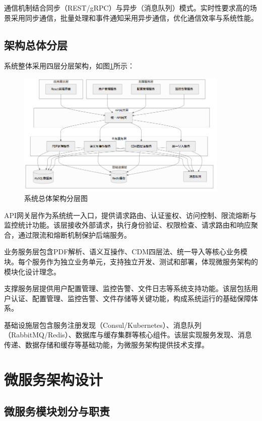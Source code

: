 通信机制结合同步（REST/gRPC）与异步（消息队列）模式。实时性要求高的场景采用同步通信，批量处理和事件通知采用异步通信，优化通信效率与系统性能。

\subsection{架构总体分层}

系统整体采用四层分层架构，如图\ref{fig:system_architecture}所示：

\begin{figure}[H]
    \centering
    \includegraphics[width=0.9\textwidth]{chapters/fig-0/system_architecture_simple.png}
    \caption{系统总体架构分层图}
    \label{fig:system_architecture}
\end{figure}

API网关层作为系统统一入口，提供请求路由、认证鉴权、访问控制、限流熔断与监控统计功能。该层接收外部请求，执行身份验证、权限检查、请求路由和响应聚合，通过限流和熔断机制保护后端服务。

业务服务层包含PDF解析、语义互操作、CDM四层法、统一导入等核心业务模块。每个服务作为独立业务单元，支持独立开发、测试和部署，体现微服务架构的模块化设计理念。

支撑服务层提供用户配置管理、监控告警、文件日志等系统支持功能。该层包括用户认证、配置管理、监控告警、文件存储等关键功能，构成系统运行的基础保障体系。

基础设施层包含服务注册发现（Consul/Kubernetes）、消息队列（RabbitMQ/Redis）、数据库与缓存集群等核心组件。该层实现服务发现、消息传递、数据存储和缓存等基础功能，为微服务架构提供技术支撑。

\section{微服务架构设计}


\subsection{微服务模块划分与职责}

